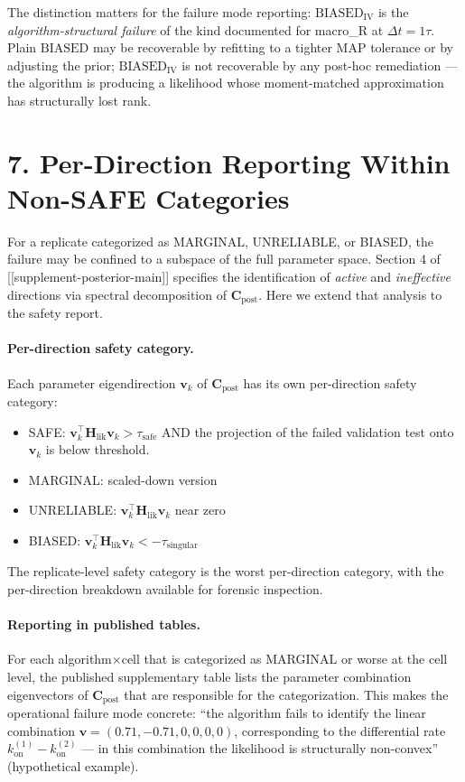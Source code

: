 \documentclass[11pt]{article}
\begin{document}
The distinction matters for the failure mode reporting:
$\mathrm{BIASED}_{\mathrm{IV}}$ is the
\emph{algorithm-structural failure} of the kind documented for
macro\_R at $\Delta t = 1\tau$. Plain $\mathrm{BIASED}$ may be
recoverable by refitting to a tighter MAP tolerance or by adjusting
the prior; $\mathrm{BIASED}_{\mathrm{IV}}$ is not recoverable by any
post-hoc remediation --- the algorithm is producing a likelihood
whose moment-matched approximation has structurally lost rank.

\section*{7. Per-Direction Reporting Within Non-SAFE Categories}
\label{sec:sc-per-direction}

For a replicate categorized as MARGINAL, UNRELIABLE, or BIASED, the
failure may be confined to a subspace of the full parameter space.
Section 4 of [[supplement-posterior-main]] specifies the
identification of \emph{active} and \emph{ineffective} directions via
spectral decomposition of $\mathbf C_{\mathrm{post}}$. Here we extend
that analysis to the safety report.

\paragraph{Per-direction safety category.}
Each parameter eigendirection $\mathbf v_k$ of
$\mathbf C_{\mathrm{post}}$ has its own per-direction safety category:
\begin{itemize}
\item SAFE: $\mathbf v_k^\top \mathbf H_{\mathrm{lik}} \mathbf v_k > \tau_{\mathrm{safe}}$
  AND the projection of the failed validation test onto $\mathbf v_k$
  is below threshold.
\item MARGINAL: scaled-down version
\item UNRELIABLE: $\mathbf v_k^\top \mathbf H_{\mathrm{lik}} \mathbf v_k$ near zero
\item BIASED: $\mathbf v_k^\top \mathbf H_{\mathrm{lik}} \mathbf v_k < -\tau_{\mathrm{singular}}$
\end{itemize}
The replicate-level safety category is the worst per-direction
category, with the per-direction breakdown available for forensic
inspection.

\paragraph{Reporting in published tables.}
For each algorithm$\times$cell that is categorized as MARGINAL or
worse at the cell level, the published supplementary table lists the
parameter combination eigenvectors of $\mathbf C_{\mathrm{post}}$
that are responsible for the categorization. This makes the
operational failure mode concrete: ``the algorithm fails to
identify the linear combination $\mathbf v = (0.71, -0.71, 0, 0, 0, 0)$,
corresponding to the differential rate $k_{\mathrm{on}}^{(1)} - k_{\mathrm{on}}^{(2)}$
--- in this combination the likelihood is structurally non-convex''
(hypothetical example).
\end{document}
